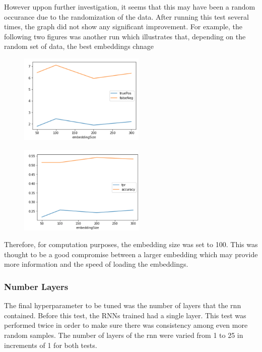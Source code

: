 \documentclass[twoside,twocolumn]{article}
\begin{document}
However uppon further investigation, it seems that this may have been a random occurance due to the
randomization of the data. After running this test several times, the graph did not show any significant
improvement. For example, the following two figures was another run which illustrates that, depending
on the random set of data, the best embeddings  chnage

\begin{figure}[H]
\includegraphics[width=6cm]{rnn_embeddSize_test_graph1}
\centering
\end{figure}


\begin{figure}[H]
\includegraphics[width=6cm]{rnn_embeddSize_test_tpr-graph1}
\centering
\end{figure}

Therefore, for computation purposes, the embedding size was set to 100. This was thought to be
a good compromise between a larger embedding which may provide more information and the speed 
of loading the embeddings.

\subsubsection{Number Layers}

The final hyperparameter to be tuned was the number of layers that the rnn contained. Before this
test, the RNNs trained had a single layer. This test was performed twice in order to make sure there
 was consistency among even more random samples. The number of layers of the rnn were varied
 from 1 to 25 in increments of 1 for both tests.
\end{document}
